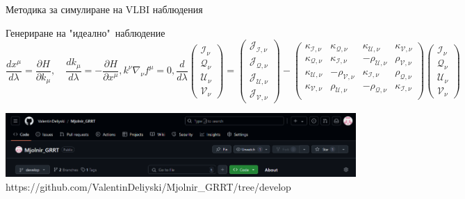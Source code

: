 \documentclass[hyperref={colorlinks,citecolor=blue,linkcolor=blue,urlcolor=blue}]{beamer}
\begin{document}
	\begin{frame}{Методика за симулиране на VLBI наблюдения}
		
		\begin{block}{Генериране на "идеално"$\,$ наблюдение}
			\small
			\begin{subequations}
				\begin{equation*}
					\frac{dx^\mu}{d\lambda} = \frac{\partial H}{\partial k_\mu},\quad \frac{d k_\mu}{d\lambda} = - \frac{\partial H}{\partial x^\mu},
				\end{equation*}
				\begin{equation*}
					k^\nu\nabla_\nu f^\mu = 0,
				\end{equation*}
				\begin{equation*}
					\frac{d}{d\lambda} \begin{pmatrix}
						\mathcal{I}_\nu\\
						\mathcal{Q}_\nu\\
						\mathcal{U}_\nu\\
						\mathcal{V}_\nu
					\end{pmatrix} = 
					\begin{pmatrix}
						\mathcal{J}_\mathcal{I,\nu}\\
						\mathcal{J}_\mathcal{Q,\nu}\\
						\mathcal{J}_\mathcal{U,\nu}\\
						\mathcal{J}_\mathcal{V,\nu}
					\end{pmatrix}
					-	\begin{pmatrix}
						\kappa_\mathcal{I,\nu} & \kappa_\mathcal{Q,\nu} & \kappa_\mathcal{U,\nu} & \kappa_\mathcal{V,\nu}\\
						\kappa_\mathcal{Q,\nu}& \kappa_\mathcal{I,\nu}& -\rho_\mathcal{U,\nu}& \rho_\mathcal{V,\nu}\\     	
						\kappa_\mathcal{U,\nu}& -\rho_\mathcal{V,\nu}& \kappa_\mathcal{I,\nu}& \rho_\mathcal{Q,\nu}\\	  
						\kappa_\mathcal{V,\nu}& \rho_\mathcal{U,\nu}& -\rho_\mathcal{Q,\nu}& \kappa_\mathcal{I,\nu}\\
					\end{pmatrix}
					\begin{pmatrix}
						\mathcal{I}_\nu\\
						\mathcal{Q}_\nu\\
						\mathcal{U}_\nu\\
						\mathcal{V}_\nu
					\end{pmatrix}
				\end{equation*}
			\end{subequations}
			
		\end{block}
		
		\centering
		\includegraphics[scale = 0.35]{Pre-Defence/github.png}
		\tiny https://github.com/ValentinDeliyski/Mjolnir\_GRRT/tree/develop
	\end{frame}
	
\end{document}
